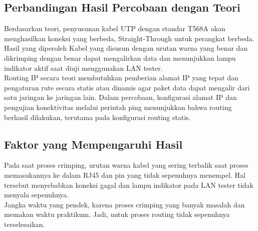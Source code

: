 \subsection{Perbandingan Hasil Percobaan dengan Teori}
Berdasarkan teori, penyusunan kabel UTP dengan standar T568A akan menghasilkan koneksi yang berbeda, Straight-Through untuk perangkat berbeda. Hasil yang diperoleh Kabel yang disusun dengan urutan warna yang benar dan dikrimping dengan benar dapat mengalirkan data dan menunjukkan lampu indikator aktif saat diuji menggunakan LAN tester. \\
Routing IP secara teori membutuhkan pemberian alamat IP yang tepat dan pengaturan rute secara statis atau dinamis agar paket data dapat mengalir dari satu jaringan ke jaringan lain. Dalam percobaan, konfigurasi alamat IP dan pengujian konektivitas melalui perintah ping menunjukkan bahwa routing berhasil dilakukan, terutama pada konfigurasi routing statis.
\subsection{Faktor yang Mempengaruhi Hasil}
Pada saat proses crimping, urutan warna kabel yang sering terbalik saat proses memasukannya ke dalam RJ45 dan pin yang tidak sepenuhnya menempel. Hal tersebut menyebabkan koneksi gagal dan lampu indikator pada LAN tester tidak menyala sepenuhnya. \\
Jangka waktu yang pendek, karena proses crimping yang banyak masalah dan memakan waktu praktikum. Jadi, untuk proses routing tidak sepenuhnya terselesaikan.

